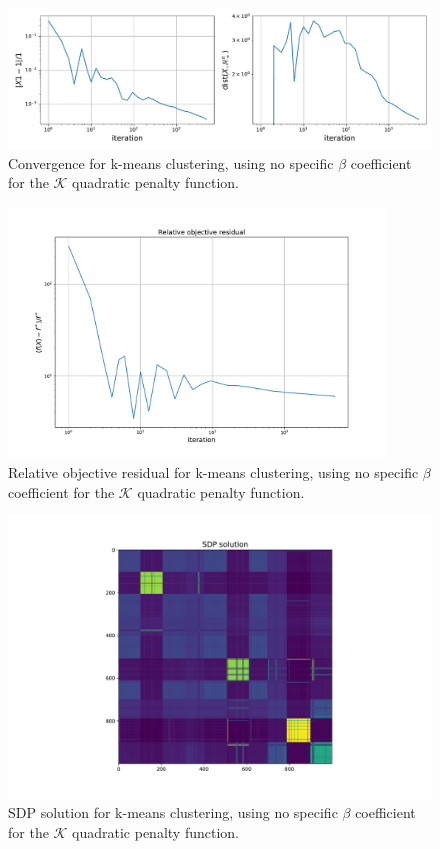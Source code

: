 \documentclass[12pt]{article}
\begin{document}
\begin{figure}[ht]
    \centering
    \includegraphics[width=17cm]{hw4/code/part3/results/no_beta/convergence.pdf}
    \caption{Convergence for k-means clustering, using no specific $\beta$ coefficient for the $\mathcal{K}$ quadratic penalty function.}
    \label{fig:no-beta-convergence}
\end{figure}
\begin{figure}[ht]
    \centering
    \includegraphics[width=10cm]{hw4/code/part3/results/no_beta/relative_objective_residual.pdf}
    \caption{Relative objective residual for k-means clustering, using no specific $\beta$ coefficient for the $\mathcal{K}$ quadratic penalty function.}
    \label{fig:no-beta-relative-obj-res}
\end{figure}
\begin{figure}[ht]
    \centering
    \includegraphics[width=12cm]{hw4/code/part3/results/no_beta/heatmap.pdf}
    \caption{SDP solution for k-means clustering, using no specific $\beta$ coefficient for the $\mathcal{K}$ quadratic penalty function.}
    \label{fig:no-beta-heatmap}
\end{figure}
\end{document}
